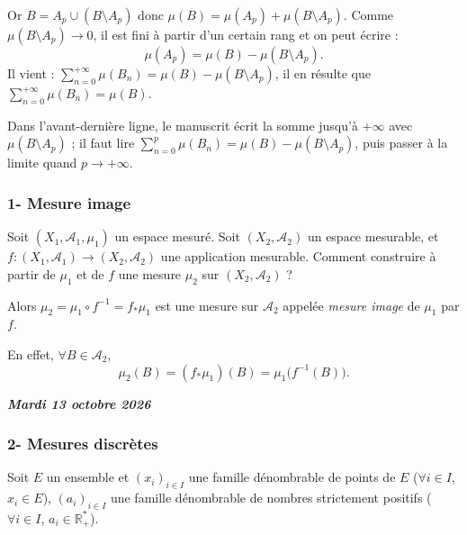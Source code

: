 \documentclass[11pt,a4paper]{article}
\newcommand{\R}{\mathbb{R}}
\newcommand{\Rb}{\overline{\mathbb{R}}}
\newcommand{\A}{\mathscr{A}}
\newcommand{\datepage}[1]{\begin{flushright}\small\bfseries\itshape\color{bleuclair}#1\end{flushright}\vspace{-8pt}}
\begin{document}
Or $B=A_p\cup(B\setminus A_p)$ donc $\mu(B)=\mu(A_p)+\mu(B\setminus A_p)$.
Comme $\mu(B\setminus A_p)\to0$, il est fini à partir d'un certain rang et on peut écrire :
\[
  \mu(A_p)=\mu(B)-\mu(B\setminus A_p).
\]
Il vient : $\displaystyle\sum_{n=0}^{+\infty}\mu(B_n)=\mu(B)-\mu(B\setminus A_p)$, il en résulte que
$\displaystyle\sum_{n=0}^{+\infty}\mu(B_n)=\mu(B)$.

\begin{note}
Dans l'avant-dernière ligne, le manuscrit écrit la somme jusqu'à $+\infty$ avec $\mu(B\setminus A_p)$ ; il faut lire
$\sum_{n=0}^{p}\mu(B_n)=\mu(B)-\mu(B\setminus A_p)$, puis passer à la limite quand $p\to+\infty$.
\end{note}

\subsubsection*{1- Mesure image}

Soit $(X_1,\A_1,\mu_1)$ un espace mesuré. Soit $(X_2,\A_2)$ un espace mesurable, et $f:(X_1,\A_1)\to(X_2,\A_2)$ une application mesurable.
Comment construire à partir de $\mu_1$ et de $f$ une mesure $\mu_2$ sur $(X_2,\A_2)$ ?

\begin{center}
\end{center}

Alors $\mu_2=\mu_1\circ f^{-1}=f_*\mu_1$ est une mesure sur $\A_2$ appelée \emph{mesure image} de $\mu_1$ par $f$.

En effet, $\forall B\in\A_2$,
\[
  \mu_2(B)=(f_*\mu_1)(B)=\mu_1\bigl(f^{-1}(B)\bigr).
\]

\datepage{Mardi 13 octobre 2026}
\subsubsection*{2- Mesures discrètes}

Soit $E$ un ensemble et $(x_i)_{i\in I}$ une famille dénombrable de points de $E$ ($\forall i\in I$, $x_i\in E$), $(a_i)_{i\in I}$ une famille dénombrable
de nombres strictement positifs ($\forall i\in I$, $a_i\in\R_+^*$).
\end{document}
